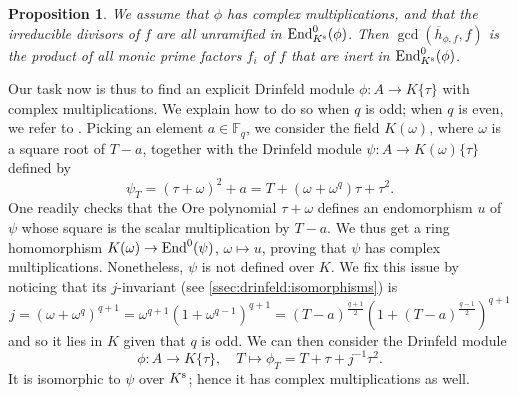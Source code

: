 \documentclass[11pt]{article}
\newtheorem{proposition}[theorem]{Proposition}
\theoremstyle{definition}
\newcommand\Fq{\mathbb{F}_q}
\newcommand\End{\text{\rm End}}
\newcommand{\Ks}{K^{\text{\rm s}}}
\begin{document}
\begin{proposition}
\label{prop:lemme-6-inert}
  We assume that $\phi$ has complex multiplications, and that the irreducible
  divisors of $f$ are all unramified in $\End^0_{\Ks}(\phi)$. 
  Then $\gcd(\overline{h}_{\phi, f}, f)$ is the product of all
  monic prime factors $f_i$ of $f$ that are inert in
  $\End^0_{\Ks}(\phi)$.
\end{proposition}

Our task now is thus to find an explicit Drinfeld module $\phi : A \to K\{\tau\}$ with complex multiplications.
We explain how to do so when $q$ is odd; when $q$ is even, we refer to \cite[Remark~7]{doliskani_drinfeld_2021}.
Picking an element $a \in \Fq$, we consider the field $K(\omega)$, where $\omega$ is a square root of $T{-}a$,
together with the Drinfeld module $\psi : A \to K(\omega)\{\tau\}$ defined by 
$$\psi_T = (\tau + \omega)^2 + a = T + (\omega + \omega^q) \tau + \tau^2.$$
One readily checks that the Ore polynomial $\tau + \omega$ defines an endomorphism $u$ of $\psi$ whose square is the scalar multiplication by $T{-}a$.
We thus get a ring homomorphism $K(\omega) \to \End^0(\psi)$, $\omega \mapsto u$, proving that $\psi$ has complex multiplications.
Nonetheless, $\psi$ is not defined over $K$. We fix this issue by noticing that its $j$-invariant (see \cref{ssec:drinfeld:isomorphisms}) is
\begin{equation}
\label{equation:j-facto}
  j = (\omega + \omega^q)^{q+1}
    = \omega^{q+1}(1 + \omega^{q-1})^{q+1}
    = (T-a)^{\frac{q+1}{2}}\left(1 + (T-a)^{\frac{q-1}{2}}\right)^{q+1}
\end{equation}
and so it lies in $K$ given that $q$ is odd.
We can then consider the Drinfeld module 
$$\phi : A \to K\{\tau\}, \quad T \mapsto \phi_T = T + \tau + j^{-1} \tau^2.$$
It is isomorphic to $\psi$ over $\Ks$; hence it has complex multiplications as well.
\end{document}
